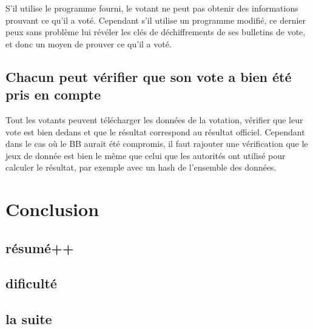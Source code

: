 \documentclass[../report]{subfiles}
\begin{document}
S'il utilise le programme fourni, le votant ne peut pas obtenir des informations prouvant ce qu'il a voté.
Cependant s'il utilise un programme modifié, ce dernier peux sans problème lui révéler les clés de déchiffrements
de ses bulletins de vote, et donc un moyen de prouver ce qu'il a voté.

\section{Chacun peut vérifier que son vote a bien été pris en compte}

Tout les votants peuvent télécharger les données de la votation, vérifier que leur vote est bien dedans et que le résultat 
correspond au résultat officiel.
Cependant dans le cas où le BB aurait été compromis, il faut rajouter une vérification que le jeux de donnée est bien le même que celui
que les autorités ont utilisé pour calculer le résultat, par exemple avec un hash de l'ensemble des données.

\chapter{Conclusion}
\todo{}

\section{résumé++}
\section{dificulté}
\section{la suite}
\end{document}
